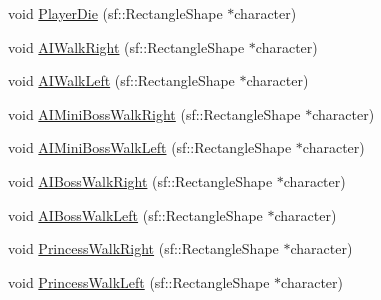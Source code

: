 \begin{DoxyCompactItemize}
\item 
void \hyperlink{classAnimation_a04ea6ebfc31ec57de2666f3ef46e310e}{Player\+Die} (sf\+::\+Rectangle\+Shape $\ast$character)
\item 
void \hyperlink{classAnimation_a61e2eb4c7a32f2e562ad0905a1a592e3}{A\+I\+Walk\+Right} (sf\+::\+Rectangle\+Shape $\ast$character)
\item 
void \hyperlink{classAnimation_ac27ea35e042306fbf3656cd7001b2a31}{A\+I\+Walk\+Left} (sf\+::\+Rectangle\+Shape $\ast$character)
\item 
void \hyperlink{classAnimation_a218b34b75cb4c574f713cc402a73e707}{A\+I\+Mini\+Boss\+Walk\+Right} (sf\+::\+Rectangle\+Shape $\ast$character)
\item 
void \hyperlink{classAnimation_aa3e38b98c8fb47c082d661c55cb40495}{A\+I\+Mini\+Boss\+Walk\+Left} (sf\+::\+Rectangle\+Shape $\ast$character)
\item 
void \hyperlink{classAnimation_a1999fd6ce4fb70a4c058ac8479cdc3f9}{A\+I\+Boss\+Walk\+Right} (sf\+::\+Rectangle\+Shape $\ast$character)
\item 
void \hyperlink{classAnimation_ab39a686342b722a37c63ea0917424ee3}{A\+I\+Boss\+Walk\+Left} (sf\+::\+Rectangle\+Shape $\ast$character)
\item 
void \hyperlink{classAnimation_ae384739d671f69c9259eea76b2b80f65}{Princess\+Walk\+Right} (sf\+::\+Rectangle\+Shape $\ast$character)
\item 
void \hyperlink{classAnimation_a62a619987f93d55f95cf6d3e8928cd83}{Princess\+Walk\+Left} (sf\+::\+Rectangle\+Shape $\ast$character)
\end{DoxyCompactItemize}
